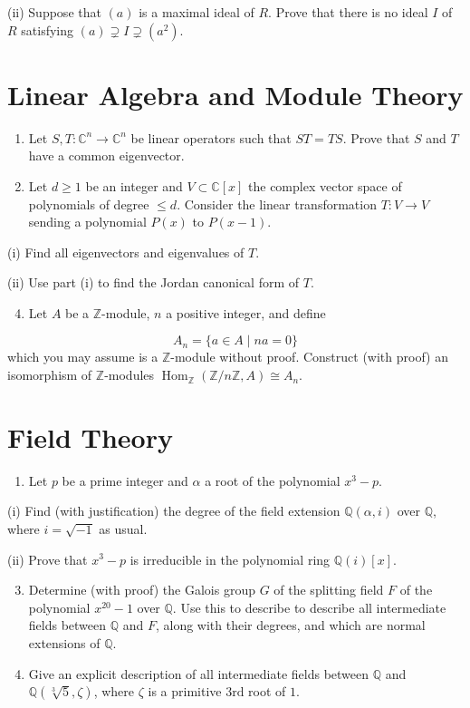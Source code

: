 \documentclass[10pt]{article}
\begin{document}
(ii) Suppose that $(a)$ is a maximal ideal of $R$. Prove that there is no ideal $I$ of $R$ satisfying $(a) \supsetneq I \supsetneq\left(a^{2}\right)$.

\section{Linear Algebra and Module Theory}
\begin{enumerate}
  \item Let $S, T: \mathbb{C}^{n} \rightarrow \mathbb{C}^{n}$ be linear operators such that $S T=T S$. Prove that $S$ and $T$ have a common eigenvector.

  \item Let $d \geq 1$ be an integer and $V \subset \mathbb{C}[x]$ the complex vector space of polynomials of degree $\leq d$. Consider the linear transformation $T: V \rightarrow V$ sending a polynomial $P(x)$ to $P(x-1)$.

\end{enumerate}
(i) Find all eigenvectors and eigenvalues of $T$.

(ii) Use part (i) to find the Jordan canonical form of $T$.

\begin{enumerate}
  \setcounter{enumi}{3}
  \item Let $A$ be a $\mathbb{Z}$-module, $n$ a positive integer, and define
\end{enumerate}
$$
A_{n}=\{a \in A \mid n a=0\}
$$
which you may assume is a $\mathbb{Z}$-module without proof. Construct (with proof) an isomorphism of $\mathbb{Z}$-modules $\operatorname{Hom}_{\mathbb{Z}}(\mathbb{Z} / n \mathbb{Z}, A) \cong A_{n}$.

\section{Field Theory}
\begin{enumerate}
  \item Let $p$ be a prime integer and $\alpha$ a root of the polynomial $x^{3}-p$.
\end{enumerate}
(i) Find (with justification) the degree of the field extension $\mathbb{Q}(\alpha, i)$ over $\mathbb{Q}$, where $i=\sqrt{-1}$ as usual.

(ii) Prove that $x^{3}-p$ is irreducible in the polynomial ring $\mathbb{Q}(i)[x]$.

\begin{enumerate}
  \setcounter{enumi}{2}
  \item Determine (with proof) the Galois group $G$ of the splitting field $F$ of the polynomial $x^{20}-1$ over $\mathbb{Q}$. Use this to describe to describe all intermediate fields between $\mathbb{Q}$ and $F$, along with their degrees, and which are normal extensions of $\mathbb{Q}$.

  \item Give an explicit description of all intermediate fields between $\mathbb{Q}$ and $\mathbb{Q}(\sqrt[3]{5}, \zeta)$, where $\zeta$ is a primitive $3 \mathrm{rd}$ root of $1 .$

\end{enumerate}
\end{document}

